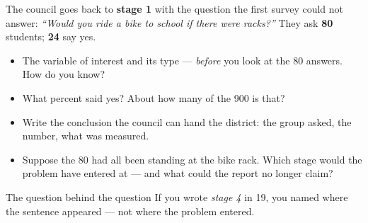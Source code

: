 \documentclass[aspectratio=169, 11pt]{beamer}
\begin{document}
\begin{frame}[t, plain]
  The council goes back to \textbf{stage 1} with the question the first survey could not
  answer: \emph{``Would you ride a bike to school if there were racks?''} They ask
  \textbf{80} students; \textbf{24} say yes.
  \begin{itemize}\setlength{\itemsep}{5pt}
    \item[16.] The variable of interest and its type --- \emph{before} you look at the 80
          answers. How do you know?
    \item[17.] What percent said yes? About how many of the 900 is that?
    \item[18.] Write the conclusion the council can hand the district: the group asked, the
          number, what was measured.
    \item[19.] Suppose the 80 had all been standing at the bike rack. Which stage would the
          problem have entered at --- and what could the report no longer claim?
  \end{itemize}
  \begin{block}{The question behind the question}
    If you wrote \emph{stage 4} in 19, you named where the sentence appeared --- not where the
    problem entered.
  \end{block}
\end{frame}
\end{document}

